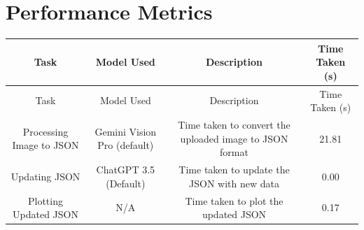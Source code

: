 \documentclass{article}
\begin{document}
\section*{Performance Metrics}
\begin{longtable}{|c|c|c|c|}
\hline
Task & Model Used & Description & Time Taken (s) \\
\hline
\endfirsthead
\hline
Task & Model Used & Description & Time Taken (s) \\
\hline
\endhead
\hline
\endfoot
Processing Image to JSON & Gemini Vision Pro (default) & Time taken to convert the uploaded image to JSON format & 21.81 \\
\hline
Updating JSON & ChatGPT 3.5 (Default) & Time taken to update the JSON with new data & 0.00 \\
\hline
Plotting Updated JSON & N/A & Time taken to plot the updated JSON & 0.17 \\
\hline
\end{longtable}
\end{document}
